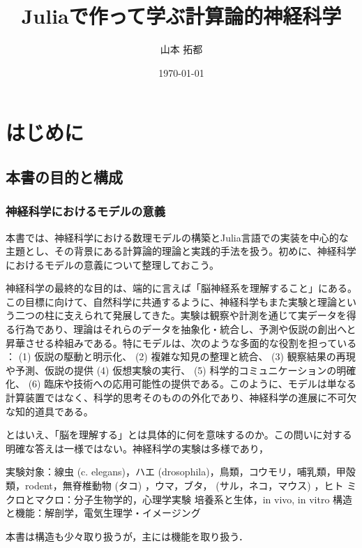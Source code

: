 \documentclass[titlepage]{ltjsbook}
\title{\Huge \textbf{Juliaで作って学ぶ計算論的神経科学}}
\author{\huge 山本 拓都}
\date{\huge \today}
\begin{document}
\setcounter{tocdepth}{2}
\tableofcontents
\clearpage
\chapter{はじめに}
\section{本書の目的と構成}
\subsection{神経科学におけるモデルの意義}
本書では、神経科学における数理モデルの構築とJulia言語での実装を中心的な主題とし、その背景にある計算論的理論と実践的手法を扱う。初めに、神経科学におけるモデルの意義について整理しておこう。

神経科学の最終的な目的は、端的に言えば「脳神経系を理解すること」にある。この目標に向けて、自然科学に共通するように、神経科学もまた実験と理論という二つの柱に支えられて発展してきた。実験は観察や計測を通じて実データを得る行為であり、理論はそれらのデータを抽象化・統合し、予測や仮説の創出へと昇華させる枠組みである。特にモデルは、次のような多面的な役割を担っている \citep{Blohm2020-vc,levenstein2023role,van2024critical}：
 (1) 仮説の駆動と明示化、 (2) 複雑な知見の整理と統合、 (3) 観察結果の再現や予測、仮説の提供 (4) 仮想実験の実行、 (5) 科学的コミュニケーションの明確化、 (6) 臨床や技術への応用可能性の提供である。このように、モデルは単なる計算装置ではなく、科学的思考そのものの外化であり、神経科学の進展に不可欠な知的道具である。

とはいえ、「脳を理解する」とは具体的に何を意味するのか。この問いに対する明確な答えは一様ではない。神経科学の実験は多様であり，


実験対象：線虫 (c. elegans)，ハエ (drosophila)，鳥類，コウモリ，哺乳類，甲殻類，rodent，無脊椎動物 (タコ) ，ウマ，ブタ， (サル，ネコ，マウス) ，ヒト
ミクロとマクロ：分子生物学的，心理学実験
培養系と生体，in vivo, in vitro
構造と機能：解剖学，電気生理学・イメージング

本書は構造も少々取り扱うが，主には機能を取り扱う．
\end{document}
